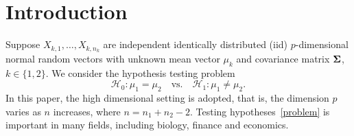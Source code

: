 \documentclass[times,sort&compress,3p]{elsarticle}
\theoremstyle{plain}
\theoremstyle{definition}
\theoremstyle{remark}
\begin{document}



\section{Introduction}
\nocite{*}

Suppose $X_{k,1},\ldots,X_{k,n_k}$  are independent identically distributed (iid) $p$-dimensional normal random vectors with unknown mean vector $\mu_k$ and covariance matrix $\boldsymbol{\Sigma}$, $k\in \{1,2\}$. We consider the hypothesis testing problem
\begin{equation}\label{problem}
    \mathcal{H}_0:\mu_1=\mu_2\quad \textrm{vs.}\quad \mathcal{H}_1:\mu_1\neq \mu_2.
\end{equation}
 In this paper, {the} high dimensional setting is adopted, that is, the dimension $p$ varies as $n$ increases, where $n=n_1+n_2-2$.
Testing hypotheses~\eqref{problem} is important in many fields, including biology, finance and economics.
\end{document}
